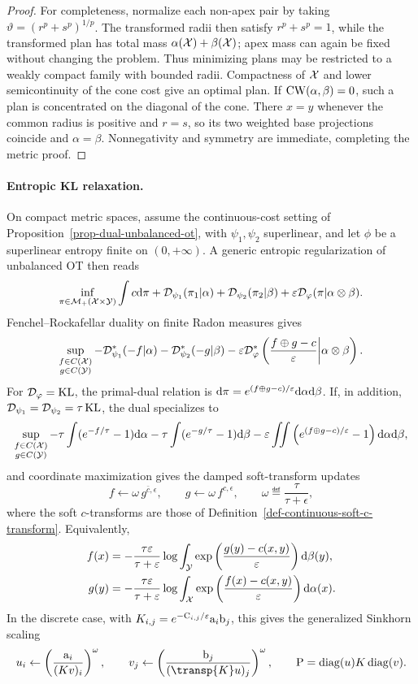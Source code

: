 \begin{proof}
For completeness, normalize each non-apex pair by taking $\vartheta=(r^p+s^p)^{1/p}$. The transformed radii then satisfy $r^p+s^p=1$, while the transformed plan has total mass $\alpha(\mathcal{X})+\beta(\mathcal{X})$; apex mass can again be fixed without changing the problem. Thus minimizing plans may be restricted to a weakly compact family with bounded radii. Compactness of $\mathcal{X}$ and lower semicontinuity of the cone cost give an optimal plan. If $\operatorname{CW}(\alpha,\beta)=0$, such a plan is concentrated on the diagonal of the cone. There $x=y$ whenever the common radius is positive and $r=s$, so its two weighted base projections coincide and $\alpha=\beta$. Nonnegativity and symmetry are immediate, completing the metric proof.
\end{proof}
\paragraph{Entropic KL relaxation.}
On compact metric spaces, assume the continuous-cost setting of Proposition~\ref{prop-dual-unbalanced-ot}, with $\psi_1,\psi_2$ superlinear, and let $\phi$ be a superlinear entropy finite on $(0,+\infty)$. A generic entropic regularization of unbalanced OT then reads
\begin{equation}\label{eq-unbalanced-entropic-primal}
\inf_{\pi\in\mathcal{M}_+(\mathcal{X}\times\mathcal{Y})}
\int c\mathrm{d}\pi
+
\mathcal{D}_{\psi_1}(\pi_1|\alpha)
+
\mathcal{D}_{\psi_2}(\pi_2|\beta)
+
\varepsilon\mathcal{D}_\varphi(\pi|\alpha\otimes\beta).
\end{equation}
Fenchel--Rockafellar duality on finite Radon measures gives
\[
\sup_{\substack{f\in C(\mathcal{X})\\g\in C(\mathcal{Y})}}
-
\mathcal{D}_{\psi_1}^*(-f|\alpha)
-
\mathcal{D}_{\psi_2}^*(-g|\beta)
-
\varepsilon\mathcal{D}_\varphi^*\left(\frac{f\oplus g-c}{\varepsilon}\middle|\alpha\otimes\beta\right).
\]
For $\mathcal{D}_\varphi=\operatorname{KL}$, the primal-dual relation is $\mathrm{d}\pi=e^{(f\oplus g-c)/\varepsilon}\mathrm{d}\alpha\mathrm{d}\beta$. If, in addition, $\mathcal{D}_{\psi_1}=\mathcal{D}_{\psi_2}=\tau\operatorname{KL}$, the dual specializes to
\[
\sup_{\substack{f\in C(\mathcal{X})\\g\in C(\mathcal{Y})}}
-\tau\int(e^{-f/\tau}-1)\mathrm{d}\alpha
-\tau\int(e^{-g/\tau}-1)\mathrm{d}\beta
-\varepsilon\iint
\left(e^{(f\oplus g-c)/\varepsilon}-1\right)
\mathrm{d}\alpha\mathrm{d}\beta,
\]
and coordinate maximization gives the damped soft-transform updates
\[
f \leftarrow \omega\, g^{\bar c,\epsilon},
\qquad
g \leftarrow \omega\, f^{c,\epsilon},
\qquad
\omega\eqdef\frac{\tau}{\tau+\epsilon},
\]
where the soft $c$-transforms are those of Definition~\ref{def-continuous-soft-c-transform}. Equivalently,
\begin{align*}
f(x)
&=
-
\frac{\tau\varepsilon}{\tau+\varepsilon}
\log\int_{\mathcal{Y}}
\exp\left(\frac{g(y)-c(x,y)}{\varepsilon}\right)\mathrm{d}\beta(y),\\
g(y)
&=
-
\frac{\tau\varepsilon}{\tau+\varepsilon}
\log\int_{\mathcal{X}}
\exp\left(\frac{f(x)-c(x,y)}{\varepsilon}\right)\mathrm{d}\alpha(x).
\end{align*}
In the discrete case, with $K_{i,j}=e^{-\mathrm{C}_{i,j}/\varepsilon}\mathrm{a}_i\mathrm{b}_j$, this gives the generalized Sinkhorn scaling
\[
u_i\leftarrow \left(\frac{\a_i}{(K v)_i}\right)^\omega,
\qquad
v_j\leftarrow \left(\frac{\b_j}{(\transp{K}u)_j}\right)^\omega,
\qquad
\P=\diag(u)K\diag(v).
\]
